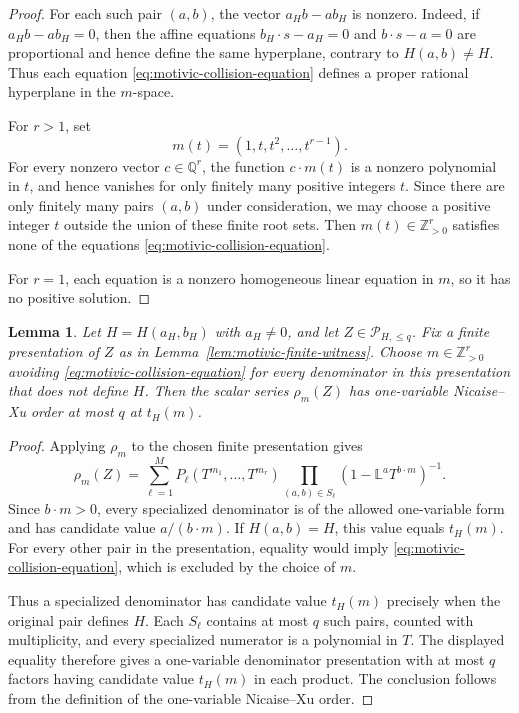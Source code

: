 \documentclass[12pt]{amsart}
\numberwithin{equation}{section}
\theoremstyle{plain}
\newtheorem{lemma}[theorem]{Lemma}
\theoremstyle{definition}
\theoremstyle{remark}
\theoremstyle{definition}
\newcommand{\Q}{\mathbb Q}
\newcommand{\Z}{\mathbb Z}
\begin{document}
\begin{proof}
For each such pair $(a,b)$, the vector $a_Hb-ab_H$ is nonzero. Indeed, if $a_Hb-ab_H=0$, then the affine equations $b_H\cdot s-a_H=0$ and $b\cdot s-a=0$ are proportional and hence define the same hyperplane, contrary to $H(a,b)\ne H$. Thus each equation \eqref{eq:motivic-collision-equation} defines a proper rational hyperplane in the $m$-space.

For $r>1$, set
\[
m(t)=(1,t,t^2,\ldots,t^{r-1}).
\]
For every nonzero vector $c\in\Q^r$, the function $c\cdot m(t)$ is a nonzero polynomial in $t$, and hence vanishes for only finitely many positive integers $t$. Since there are only finitely many pairs $(a,b)$ under consideration, we may choose a positive integer $t$ outside the union of these finite root sets. Then $m(t)\in\Z_{>0}^r$ satisfies none of the equations \eqref{eq:motivic-collision-equation}.

For $r=1$, each equation is a nonzero homogeneous linear equation in $m$, so it has no positive solution.
\end{proof}

\begin{lemma}\label{lem:motivic-witness-specialization}
Let $H=H(a_H,b_H)$ with $a_H\ne0$, and let $Z\in\mathscr P_{H,\le q}$. Fix a finite presentation of $Z$ as in Lemma~\ref{lem:motivic-finite-witness}. Choose $m\in\Z_{>0}^r$ avoiding \eqref{eq:motivic-collision-equation} for every denominator in this presentation that does not define $H$. Then the scalar series $\rho_m(Z)$ has one-variable Nicaise--Xu order at most $q$ at $t_H(m)$.
\end{lemma}

\begin{proof}
Applying $\rho_m$ to the chosen finite presentation gives
\[
\rho_m(Z)=\sum_{\ell=1}^M P_\ell(T^{m_1},\ldots,T^{m_r})\prod_{(a,b)\in S_\ell}(1-\mathbb L^aT^{b\cdot m})^{-1}.
\]
Since $b\cdot m>0$, every specialized denominator is of the allowed one-variable form and has candidate value $a/(b\cdot m)$. If $H(a,b)=H$, this value equals $t_H(m)$. For every other pair in the presentation, equality would imply \eqref{eq:motivic-collision-equation}, which is excluded by the choice of $m$.

Thus a specialized denominator has candidate value $t_H(m)$ precisely when the original pair defines $H$. Each $S_\ell$ contains at most $q$ such pairs, counted with multiplicity, and every specialized numerator is a polynomial in $T$. The displayed equality therefore gives a one-variable denominator presentation with at most $q$ factors having candidate value $t_H(m)$ in each product. The conclusion follows from the definition of the one-variable Nicaise--Xu order.
\end{proof}
\end{document}

